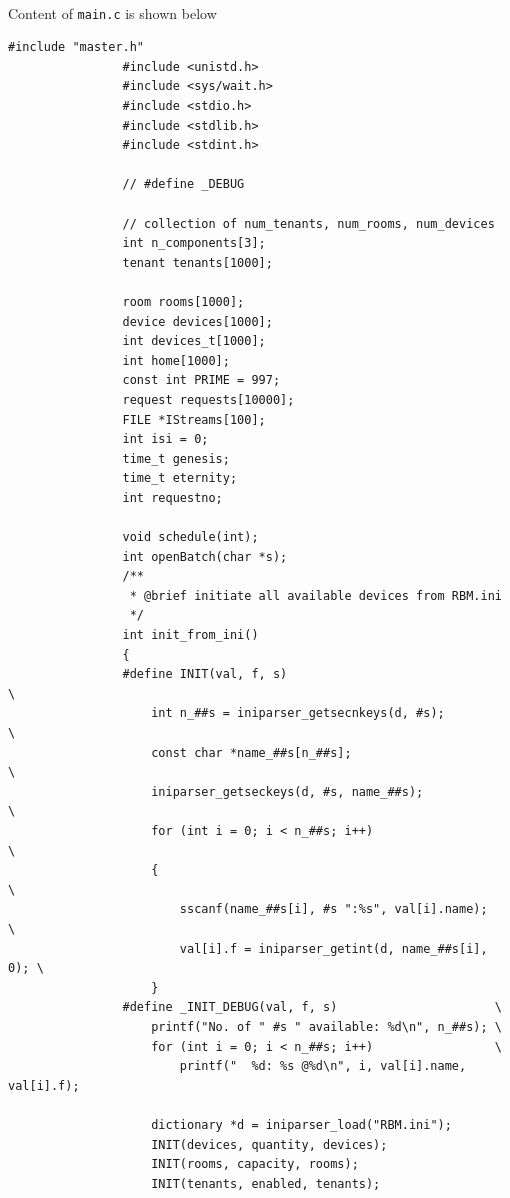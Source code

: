 \documentclass{article}
\begin{document}
            \paragraph{}
                Content of \texttt{main.c} is shown below
            \begin{Verbatim}[gobble=8]
                #include "master.h"
                #include <unistd.h>
                #include <sys/wait.h>
                #include <stdio.h>
                #include <stdlib.h>
                #include <stdint.h>
                
                // #define _DEBUG
                
                // collection of num_tenants, num_rooms, num_devices
                int n_components[3];
                tenant tenants[1000];
                
                room rooms[1000];
                device devices[1000];
                int devices_t[1000];
                int home[1000];
                const int PRIME = 997;
                request requests[10000];
                FILE *IStreams[100];
                int isi = 0;
                time_t genesis;
                time_t eternity;
                int requestno;
                
                void schedule(int);
                int openBatch(char *s);
                /**
                 * @brief initiate all available devices from RBM.ini
                 */
                int init_from_ini()
                {
                #define INIT(val, f, s)                                 \
                    int n_##s = iniparser_getsecnkeys(d, #s);           \
                    const char *name_##s[n_##s];                        \
                    iniparser_getseckeys(d, #s, name_##s);              \
                    for (int i = 0; i < n_##s; i++)                     \
                    {                                                   \
                        sscanf(name_##s[i], #s ":%s", val[i].name);     \
                        val[i].f = iniparser_getint(d, name_##s[i], 0); \
                    }
                #define _INIT_DEBUG(val, f, s)                      \
                    printf("No. of " #s " available: %d\n", n_##s); \
                    for (int i = 0; i < n_##s; i++)                 \
                        printf("  %d: %s @%d\n", i, val[i].name, val[i].f);
                
                    dictionary *d = iniparser_load("RBM.ini");
                    INIT(devices, quantity, devices);
                    INIT(rooms, capacity, rooms);
                    INIT(tenants, enabled, tenants);
                

\end{Verbatim}
\end{document}
